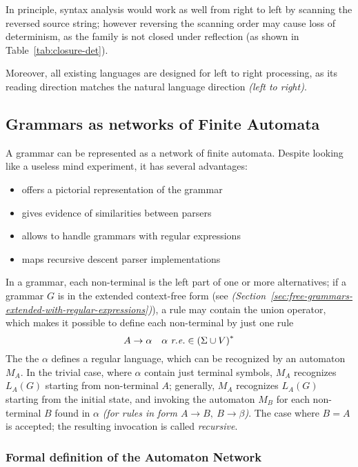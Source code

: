 \documentclass[english]{article}
\begin{document}
\bigskip
In principle, syntax analysis would work as well from right to left by scanning the reversed source string;
however reversing the scanning order may cause loss of determinism, as the \DET family is not closed under reflection (as shown in Table~\ref{tab:closure-det}).

Moreover, all existing languages are designed for left to right processing, as its reading direction matches the natural language direction \textit{(left to right)}.

\subsection{Grammars as networks of Finite Automata}

A grammar can be represented as a network of finite automata.
Despite looking like a useless mind experiment, it has several advantages:

\begin{itemize}
  \item offers a pictorial representation of the grammar
  \item gives evidence of similarities between parsers
  \item allows to handle grammars with regular expressions
  \item maps recursive descent parser implementations
\end{itemize}

\bigskip
In a grammar, each non-terminal is the left part of one or more alternatives;
if a grammar \(G\) is in the extended context-free form (see \textit{(Section~\ref{sec:free-grammars-extended-with-regular-expressions})}), a rule \RP may contain the union operator, which makes it possible to define each non-terminal by just one rule
\[ A \rightarrow \alpha \quad \alpha \ \textit{r.e.} \in \left( \Sigma \cup V \right)^\ast \]
The the \re \(\alpha\) defines a regular language, which can be recognized by an automaton \(M_A\).
In the trivial case, where \(\alpha\) contain just terminal symbols, \(M_A\) recognizes \(L_A(G)\) starting from non-terminal \(A\);
generally, \(M_A\) recognizes \(L_A(G)\) starting from the initial state, and invoking the automaton \(M_{B}\) for each non-terminal \(B\) found in \(\alpha\) \textit{(for rules in form \(A \rightarrow B,\  B \rightarrow \beta\))}.
The case where \(B = A\) is accepted; the resulting invocation is called \textit{recursive}.

\subsubsection{Formal definition of the Automaton Network}
\end{document}
